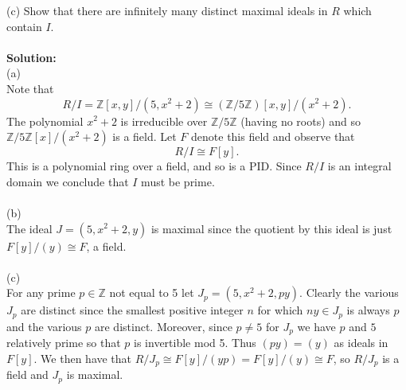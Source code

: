 \documentclass[11pt]{article}
\newcommand{\Z}{\mathbb{Z}}
\begin{document}
(c) Show that there are infinitely many distinct maximal ideals in $R$ which contain $I$.\\\\
\textbf{Solution:}\\
(a)\\
Note that \[
R/I = \Z[x,y]/(5,x^2+2) \cong (\Z/5\Z)[x,y]/(x^2+2).
\]
The polynomial $x^2+2$ is irreducible over $\Z/5\Z$ (having no roots) and so $\Z/5\Z[x]/(x^2+2)$ is a field. Let $F$ denote this field and observe that \[
R/I \cong F[y].
\]
This is a polynomial ring over a field, and so is a PID. Since $R/I$ is an integral domain we conclude that $I$ must be prime. \\\\
(b)\\
The ideal $J = (5,x^2+2, y)$ is maximal since the quotient by this ideal is just $F[y]/(y) \cong F$, a field.\\\\
(c)\\
For any prime $p\in\Z$ not equal to 5 let $J_p = (5,x^2+2, py)$. Clearly the various $J_p$ are distinct since the smallest positive integer $n$ for which $ny\in J_p$ is always $p$ and the various $p$ are distinct. Moreover, since $p\neq 5$ for $J_p$ we have $p$ and $5$ relatively prime so that $p$ is invertible mod 5. Thus $(py) = (y)$ as ideals in $F[y]$. We then have that $R/J_p \cong F[y]/(yp) = F[y]/(y) \cong F$, so $R/J_p$ is a field and $J_p$ is maximal. 
\end{document}
